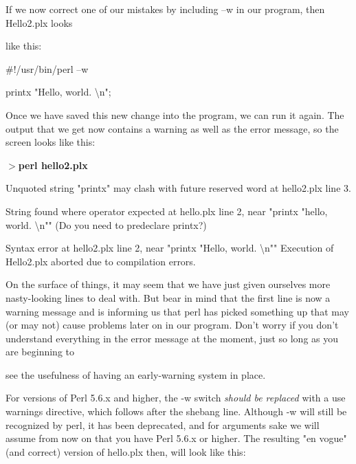 \documentclass[a4paper,11pt]{book}
\begin{document}
\noindent 

\noindent If we now  correct  one of our mistakes  by  including  --w in our program,  then  Hello2.plx looks

\noindent like this:

\noindent 

\noindent \#!/usr/bin/perl --w

\noindent 

\noindent printx "Hello, world. \textbackslash n";

\noindent 

\noindent Once we have saved this new change into the program, we can run it again. The output that we get now contains a warning as well as the error message, so the screen looks like this:

\noindent 

\noindent \textbf{$>$perl hello2.plx}

\noindent 

\noindent Unquoted string "printx" may clash with future reserved word at hello2.plx line 3.

\noindent String found where operator expected at hello.plx line 2, near "printx "hello, world. \textbackslash n"" (Do you need to predeclare printx?)

\noindent Syntax error at hello2.plx line 2, near "printx "Hello, world. \textbackslash n"" Execution of Hello2.plx aborted due to compilation errors.

\noindent 

\noindent On the surface of things, it may seem that we have just given ourselves more nasty-looking lines to deal with. But bear in mind that the first line is now a warning  message and is informing us that perl has picked something up that may (or may not) cause problems later on in our program. Don't worry if you don't understand everything in the error message at the moment, just so long as you are beginning to

\noindent see the usefulness of having an early-warning system in place.

\noindent 

\noindent For versions of Perl 5.6.x and higher, the -w switch \textit{should be replaced }with a use warnings directive, which follows after the shebang line. Although -w will still be recognized by perl, it has been deprecated, and for arguments sake we will assume from now on that you have Perl 5.6.x or higher. The resulting "en vogue" (and correct) version of hello.plx then, will look like this:
\end{document}
